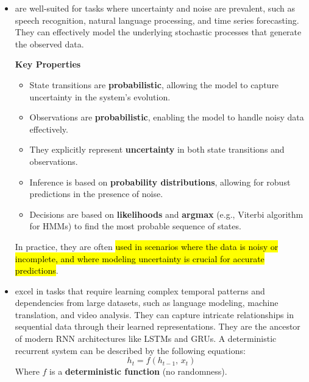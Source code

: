 \begin{itemize}
    \item {} are well-suited for tasks where uncertainty and noise are prevalent, such as speech recognition, natural language processing, and time series forecasting. They can effectively model the underlying stochastic processes that generate the observed data.
    
    \textcolor{Green3}{ \textbf{Key Properties}}
    \begin{itemize}
        \item State transitions are \textbf{probabilistic}, allowing the model to capture uncertainty in the system's evolution.
        \item Observations are \textbf{probabilistic}, enabling the model to handle noisy data effectively.
        \item They explicitly represent \textbf{uncertainty} in both state transitions and observations.
        \item Inference is based on \textbf{probability distributions}, allowing for robust predictions in the presence of noise.
        \item Decisions are based on \textbf{likelihoods} and \textbf{argmax} (e.g., Viterbi algorithm for HMMs) to find the most probable sequence of states.
    \end{itemize}
    In practice, they are often \hl{used in scenarios where the data is noisy or incomplete, and where modeling uncertainty is crucial for accurate predictions}.
    
    \item {} excel in tasks that require learning complex temporal patterns and dependencies from large datasets, such as language modeling, machine translation, and video analysis. They can capture intricate relationships in sequential data through their learned representations. They are the ancestor of modern RNN architectures like LSTMs and GRUs. A deterministic recurrent system can be described by the following equations:
    \begin{equation*}
        h_t = f\left(h_{t-1}, \, x_t\right)
    \end{equation*}
    Where $f$ is a \textbf{deterministic function} (no randomness).


\end{itemize}
